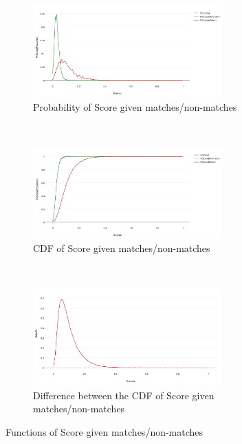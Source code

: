 \begin{figure}[htbp]
  \centering
  \begin{subfigure}[t]{\textwidth}
      \centering
      \includegraphics[width=0.8\textwidth]{dataset/otago/psm}
        \caption{Probability of Score given matches/non-matches}
      \label{fig:otago_psm} %
    \end{subfigure}%
  \\
  \begin{subfigure}[t]{\textwidth}
      \centering
      \includegraphics[width=0.8\textwidth]{dataset/otago/csm}
        \caption{CDF of Score given matches/non-matches}
      \label{fig:otago_csm} %
    \end{subfigure}%
  \\
  \begin{subfigure}[t]{\textwidth}
      \centering
      \includegraphics[width=0.8\textwidth]{dataset/otago/dsm}
        \caption{Difference between the CDF of Score given matches/non-matches}
        \label{fig:otago_dsm} %
    \end{subfigure}%
  \caption{Functions of Score given matches/non-matches}
  \label{fig:otago_sm}
\end{figure}

